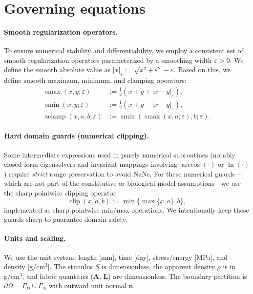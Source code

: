 \section*{Governing equations}
\label{sec:strong-forms-nd}

\paragraph{Smooth regularization operators.}
To ensure numerical stability and differentiability, we employ a consistent set of smooth regularization operators parameterized by a smoothing width $\varepsilon > 0$. We define the smooth absolute value as $|x|_\varepsilon := \sqrt{x^2+\varepsilon^2}-\varepsilon$. Based on this, we define smooth maximum, minimum, and clamping operators:
\begin{align} \label{eq:smooth-max-nd}
\operatorname{smax}(x,y;\varepsilon) &:= \tfrac{1}{2}(x+y+|x-y|_\varepsilon), \nonumber \\
\operatorname{smin}(x,y;\varepsilon) &:= \tfrac{1}{2}(x+y-|x-y|_\varepsilon), \\
\operatorname{sclamp}(x,a,b;\varepsilon) &:= \operatorname{smin}(\operatorname{smax}(x,a;\varepsilon),b;\varepsilon). \nonumber
\end{align}

\paragraph{Hard domain guards (numerical clipping).}
Some intermediate expressions used in purely numerical subroutines (notably closed-form eigensolvers and invariant mappings involving $\arccos(\cdot)$ or $\ln(\cdot)$) require \emph{strict} range preservation to avoid NaNs. For these numerical guards---which are not part of the constitutive or biological model assumptions---we use the sharp pointwise clipping operator
\[
\operatorname{clip}(x,a,b):=\min\{\max\{x,a\},b\},
\]
implemented as sharp pointwise min/max operations. We intentionally keep these guards sharp to guarantee domain safety.

\paragraph{Units and scaling.}
We use the unit system: length [mm], time [day], stress/energy [MPa], and density [g/cm$^3$]. The stimulus $S$ is dimensionless, the apparent density $\rho$ is in g/cm$^3$, and fabric quantities ($\mathbf{A}$, $\mathbf{L}$) are dimensionless. The boundary partition is $\partial\Omega=\Gamma_D\cup\Gamma_N$ with outward unit normal $\mathbf{n}$.

